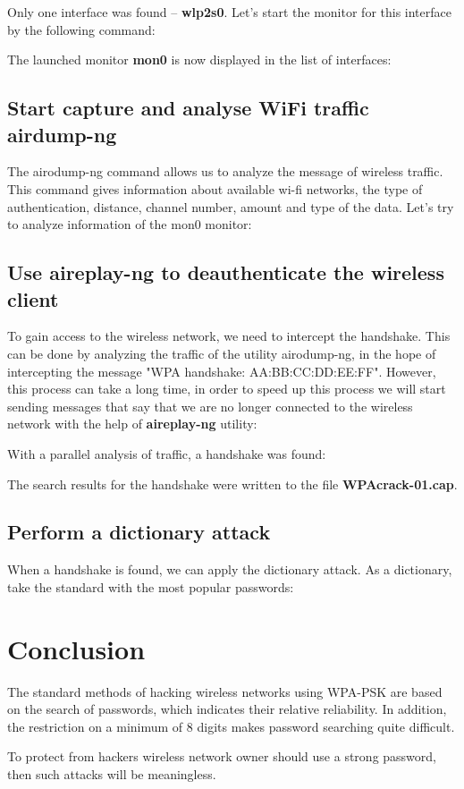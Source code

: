 \documentclass[14pt,a4paper,report]{report}
\begin{document}


Only one interface was found -- \textbf{wlp2s0}. Let's start the monitor for this interface by the following command:



The launched monitor \textbf{mon0} is now displayed in the list of interfaces:



\subsection{Start capture and analyse WiFi traffic airdump-ng}

The airodump-ng command allows us to analyze the message of wireless traffic. This command gives information about available wi-fi networks, the type of authentication, distance, channel number, amount and type of the data. Let's try to analyze information of the mon0 monitor:



\subsection{Use aireplay-ng to deauthenticate the wireless client}

To gain access to the wireless network, we need to intercept the handshake. This can be done by analyzing the traffic of the utility airodump-ng, in the hope of intercepting the message "WPA handshake: AA:BB:CC:DD:EE:FF". However, this process can take a long time, in order to speed up this process we will start sending messages that say that we are no longer connected to the wireless network with the help of \textbf{aireplay-ng} utility:



With a parallel analysis of traffic, a handshake was found:



The search results for the handshake were written to the file \textbf{WPAcrack-01.cap}.

\subsection{Perform a dictionary attack}

When a handshake is found, we can apply the dictionary attack. As a dictionary, take the standard with the most popular passwords:



\section{Conclusion}

The standard methods of hacking wireless networks using WPA-PSK are based on the search of passwords, which indicates their relative reliability. In addition, the restriction on a minimum of 8 digits makes password searching quite difficult.

To protect from hackers wireless network owner should use a strong password, then such attacks will be meaningless.
\end{document}
